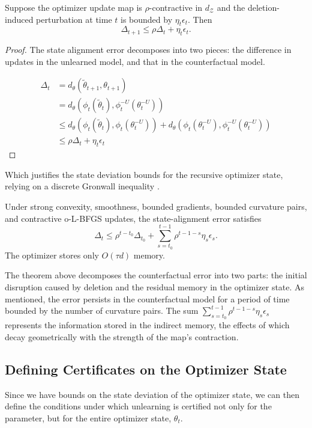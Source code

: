 \documentclass{ssl}
\begin{document}
\begin{lemma}
\label{lem:state-error-recursion}
Suppose the optimizer update map is $\rho$-contractive in $d_{\mathcal Z}$ and the deletion-induced perturbation at time $t$ is bounded by $\eta_t\epsilon_t$. Then
$$
\Delta_{t+1}
\le
\rho \Delta_t + \eta_t\epsilon_t.
$$
\end{lemma}
\begin{proof}
The state alignment error decomposes into two pieces: the difference in updates in the unlearned model, and that in the counterfactual model.

\begin{align*}
  \Delta_t &= d_\theta(\tilde \theta_{t+1}, \theta_{t+1}) \\
    &= d_{\theta}(\phi_t(\tilde \theta_t), \phi_t^{-U}(\theta_t^{-U})) \\
    &\leq d_{\theta}(\phi_t(\tilde \theta_t), \phi_t(\theta_{t}^{-U})) + d_{\theta}(\phi_t(\theta_t^{-U}), \phi_t^{-U}(\theta_{t}^{-U})) \\
    &\leq \rho \Delta_t + \eta_t \epsilon_t
\end{align*}
\end{proof}

Which justifies the state deviation bounds for the recursive optimizer state, relying on a discrete Gronwall inequality \cite{liao_discrete_2018}.

\begin{theorem}
\label{thm: bounded-counterfactual-state-deviation}
Under strong convexity, smoothness, bounded gradients, bounded curvature pairs, and contractive o-L-BFGS updates, the state-alignment error satisfies
$$
\Delta_t
\le
\rho^{t-t_0}\Delta_{t_0}
+
\sum_{s=t_0}^{t-1}\rho^{t-1-s}\eta_s\epsilon_s.
$$
The optimizer stores only $O(\tau d)$ memory.
\end{theorem}

The theorem above decomposes the counterfactual error into two parts: the initial disruption caused by deletion and the residual memory in the optimizer state. As mentioned, the error persists in the counterfactual model for a period of time bounded by the number of curvature pairs. The sum $\sum_{s=t_0}^{t-1}\rho^{t-1-s}\eta_s\epsilon_s$ represents the information stored in the indirect memory, the effects of which decay geometrically with the strength of the map's contraction.

\subsection{Defining Certificates on the Optimizer State}
Since we have bounds on the state deviation of the optimizer state, we can then define the conditions under which unlearning is certified not only for the parameter, but for the entire optimizer state, $\theta_t.$ 
\end{document}
